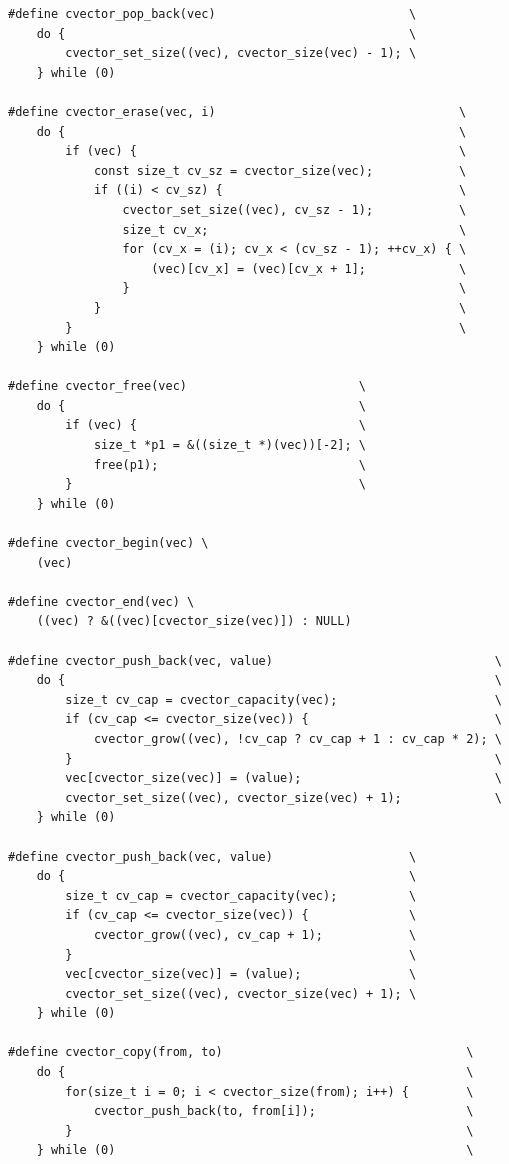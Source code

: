 \documentclass{article}
\begin{document}
\begin{verbatim}
#define cvector_pop_back(vec)                           \
	do {                                                \
		cvector_set_size((vec), cvector_size(vec) - 1); \
	} while (0)

#define cvector_erase(vec, i)                                  \
	do {                                                       \
		if (vec) {                                             \
			const size_t cv_sz = cvector_size(vec);            \
			if ((i) < cv_sz) {                                 \
				cvector_set_size((vec), cv_sz - 1);            \
				size_t cv_x;                                   \
				for (cv_x = (i); cv_x < (cv_sz - 1); ++cv_x) { \
					(vec)[cv_x] = (vec)[cv_x + 1];             \
				}                                              \
			}                                                  \
		}                                                      \
	} while (0)

#define cvector_free(vec)                        \
	do {                                         \
		if (vec) {                               \
			size_t *p1 = &((size_t *)(vec))[-2]; \
			free(p1);                            \
		}                                        \
	} while (0)

#define cvector_begin(vec) \
	(vec)

#define cvector_end(vec) \
	((vec) ? &((vec)[cvector_size(vec)]) : NULL)

#define cvector_push_back(vec, value)                               \
	do {                                                            \
		size_t cv_cap = cvector_capacity(vec);                      \
		if (cv_cap <= cvector_size(vec)) {                          \
			cvector_grow((vec), !cv_cap ? cv_cap + 1 : cv_cap * 2); \
		}                                                           \
		vec[cvector_size(vec)] = (value);                           \
		cvector_set_size((vec), cvector_size(vec) + 1);             \
	} while (0)

#define cvector_push_back(vec, value)                   \
	do {                                                \
		size_t cv_cap = cvector_capacity(vec);          \
		if (cv_cap <= cvector_size(vec)) {              \
			cvector_grow((vec), cv_cap + 1);            \
		}                                               \
		vec[cvector_size(vec)] = (value);               \
		cvector_set_size((vec), cvector_size(vec) + 1); \
	} while (0)

#define cvector_copy(from, to)									\
	do {														\
		for(size_t i = 0; i < cvector_size(from); i++) {		\
			cvector_push_back(to, from[i]);						\
		}														\
	} while (0)													\


\end{verbatim}
\end{document}
